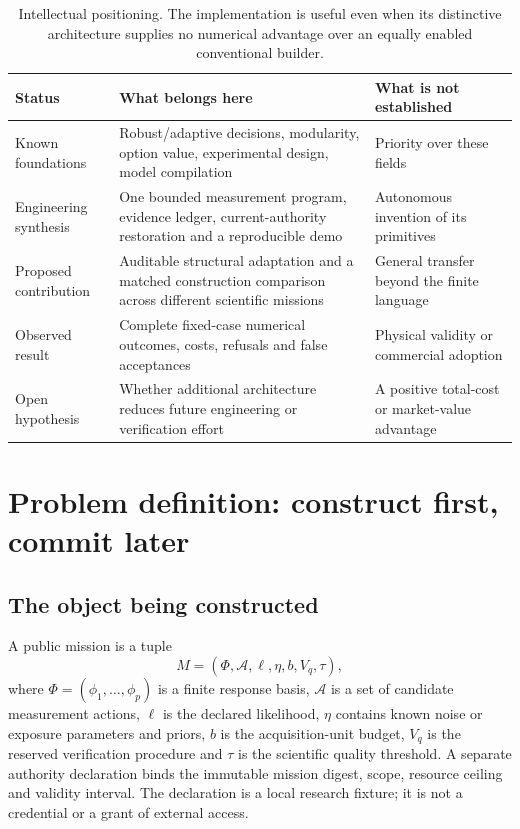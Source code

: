 \documentclass[11pt,letterpaper]{article}
\begin{document}
\begin{table}[htbp]
\centering\small
\begin{tabularx}{\linewidth}{@{}p{.23\linewidth}XX@{}}
\toprule
\textbf{Status} & \textbf{What belongs here} & \textbf{What is not established}\\
\midrule
Known foundations & Robust/adaptive decisions, modularity, option value, experimental design, model compilation & Priority over these fields\\
Engineering synthesis & One bounded measurement program, evidence ledger, current-authority restoration and a reproducible demo & Autonomous invention of its primitives\\
Proposed contribution & Auditable structural adaptation and a matched construction comparison across different scientific missions & General transfer beyond the finite language\\
Observed result & Complete fixed-case numerical outcomes, costs, refusals and false acceptances & Physical validity or commercial adoption\\
Open hypothesis & Whether additional architecture reduces future engineering or verification effort & A positive total-cost or market-value advantage\\
\bottomrule
\end{tabularx}
\caption{Intellectual positioning. The implementation is useful even when its distinctive architecture supplies no numerical advantage over an equally enabled conventional builder.}
\end{table}

\section{Problem definition: construct first, commit later}

\subsection{The object being constructed}

A public mission is a tuple
\begin{equation}
M=(\Phi,\mathcal A,\ell,\eta,b,V_q,\tau),
\end{equation}
where $\Phi=(\phi_1,\ldots,\phi_p)$ is a finite response basis, $\mathcal A$ is a set of candidate measurement actions, $\ell$ is the declared likelihood, $\eta$ contains known noise or exposure parameters and priors, $b$ is the acquisition-unit budget, $V_q$ is the reserved verification procedure and $\tau$ is the scientific quality threshold. A separate authority declaration binds the immutable mission digest, scope, resource ceiling and validity interval. The declaration is a local research fixture; it is not a credential or a grant of external access.
\end{document}
